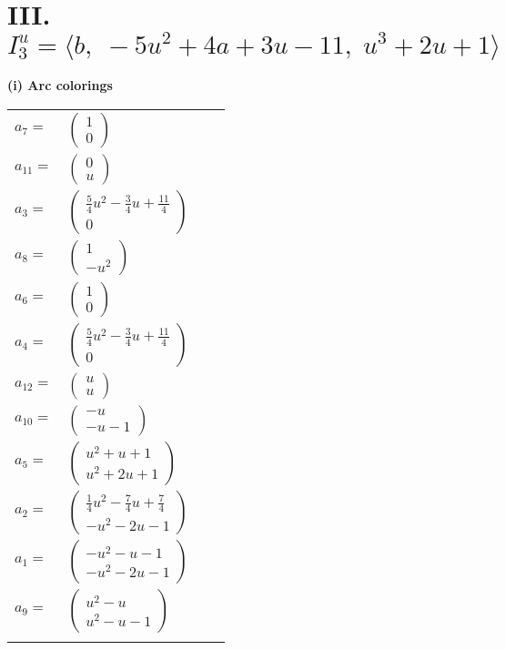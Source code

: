 \documentclass[1p]{elsarticle_modified}
\theoremstyle{definition}
\begin{document}
\centering \section*{III. $I^u_{3}= \langle b,\;-5 u^2+4 a+3 u-11,\;u^3+2 u+1 \rangle$}
\flushleft \textbf{(i) Arc colorings}\\
\begin{tabular}{m{7pt} m{180pt} m{7pt} m{180pt} }
\flushright $a_{7}=$&$\begin{pmatrix}1\\0\end{pmatrix}$ \\
\flushright $a_{11}=$&$\begin{pmatrix}0\\u\end{pmatrix}$ \\
\flushright $a_{3}=$&$\begin{pmatrix}\frac{5}{4} u^2-\frac{3}{4} u+\frac{11}{4}\\0\end{pmatrix}$ \\
\flushright $a_{8}=$&$\begin{pmatrix}1\\- u^2\end{pmatrix}$ \\
\flushright $a_{6}=$&$\begin{pmatrix}1\\0\end{pmatrix}$ \\
\flushright $a_{4}=$&$\begin{pmatrix}\frac{5}{4} u^2-\frac{3}{4} u+\frac{11}{4}\\0\end{pmatrix}$ \\
\flushright $a_{12}=$&$\begin{pmatrix}u\\u\end{pmatrix}$ \\
\flushright $a_{10}=$&$\begin{pmatrix}- u\\- u-1\end{pmatrix}$ \\
\flushright $a_{5}=$&$\begin{pmatrix}u^2+u+1\\u^2+2 u+1\end{pmatrix}$ \\
\flushright $a_{2}=$&$\begin{pmatrix}\frac{1}{4} u^2-\frac{7}{4} u+\frac{7}{4}\\- u^2-2 u-1\end{pmatrix}$ \\
\flushright $a_{1}=$&$\begin{pmatrix}- u^2- u-1\\- u^2-2 u-1\end{pmatrix}$ \\
\flushright $a_{9}=$&$\begin{pmatrix}u^2- u\\u^2- u-1\end{pmatrix}$\\&\end{tabular}
\end{document}
